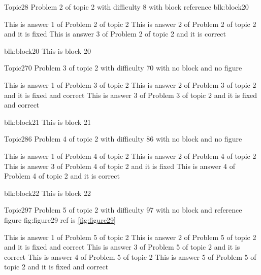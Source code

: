 \documentclass[master]{exam}
\begin{document}
\begin{problem}[requires=blk:block20]{Topic2}{8}
	Problem 2 of topic 2 with difficulty 8 with block reference blk:block20
	\begin{answers}
		\answer This is answer 1 of Problem 2 of topic 2 
		\answer[fixed] This is answer 2 of Problem 2 of topic 2 and it is fixed
		\answer[correct] This is answer 3 of Problem 2 of topic 2 and it is correct
	\end{answers}
\end{problem}



\begin{block}{blk:block20}
This is block 20
\end{block}


\begin{problem}{Topic2}{70}
	Problem 3 of topic 2 with difficulty 70 with no block and no figure
	\begin{answers}
		\answer This is answer 1 of Problem 3 of topic 2 
		 This is answer 2 of Problem 3 of topic 2 and it is fixed and correct
		 This is answer 3 of Problem 3 of topic 2 and it is fixed and correct
	\end{answers}
\end{problem}



\begin{block}{blk:block21}
This is block 21
\end{block}


\begin{problem}{Topic2}{86}
	Problem 4 of topic 2 with difficulty 86 with no block and no figure
	\begin{answers}
		\answer This is answer 1 of Problem 4 of topic 2 
		\answer This is answer 2 of Problem 4 of topic 2 
		\answer[fixed] This is answer 3 of Problem 4 of topic 2 and it is fixed
		\answer[correct] This is answer 4 of Problem 4 of topic 2 and it is correct
	\end{answers}
\end{problem}



\begin{block}{blk:block22}
This is block 22
\end{block}


\begin{problem}{Topic2}{97}
	Problem 5 of topic 2 with difficulty 97 with no block and reference figure fig:figure29 ref is \ref{fig:figure29}
	\begin{answers}
		\answer This is answer 1 of Problem 5 of topic 2 
		 This is answer 2 of Problem 5 of topic 2 and it is fixed and correct
		\answer[correct] This is answer 3 of Problem 5 of topic 2 and it is correct
		\answer This is answer 4 of Problem 5 of topic 2 
		 This is answer 5 of Problem 5 of topic 2 and it is fixed and correct
	\end{answers}
\end{problem}
\end{document}
